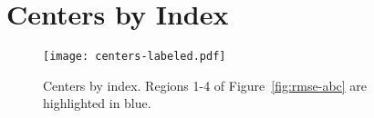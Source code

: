 \chapter{Centers by Index}\label{app:centers-index}
\vspace{-3em}
\begin{figure}[H]
    \texttt{[image: centers-labeled.pdf]}
    \caption[Centers by index]{Centers by index. Regions 1-4 of Figure~\ref{fig:rmse-abc} are highlighted in blue.}
\end{figure}

